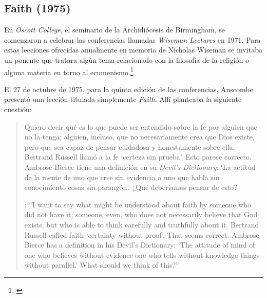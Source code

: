 \subsection{Faith (1975)}

En \emph{Oscott College}, el seminario de la Archidiócesis de Birmingham, se comenzaron a celebrar las conferencias llamadas \emph{Wiseman Lectures} en 1971. Para estas lecciones ofrecidas anualmente en memoria de Nicholas Wiseman se invitaba un ponente que tratara algún tema relacionado con la filosofía de la religión o alguna materia en torno al ecumenismo.\footnote{\cite[Cf.~][7]{wisemanlects}}

El 27 de octubre de 1975, para la quinta edición de las conferencias, Anscombe presentó una lección titulada simplemente \emph{Faith}. Allí planteaba la siguiente cuestión: \blockquote[{\cite[115]{anscombe1981erp:faith}}: \enquote{I want to say what might be understood about faith by someone who did not have it; someone, even, who does not necessarily believe that God exists, but who is able to think carefully and truthfully about it. Bertrand Russell called faith `certainty without proof'. That seems correct. Ambrose Bierce has a definition in his Devil's Dictionary: `The attitude of mind of one who believes without evidence one who tells without knowledge things without parallel.' What should we think of this?}]{Quiero decir qué es lo que puede ser entendido sobre la fe por alguien que no la tenga; alguien, incluso, que no necesariamente crea que Dios existe, pero que sea capaz de pensar cuidadosa y honestamente sobre ella. Bertrand Russell llamó a la fe `certeza sin prueba'. Esto parece correcto. Ambrose Bierce tiene una definición en su \emph{Devil's Dictionary}: `La actitud de la mente de uno que cree sin evidencia a uno que habla sin conocimiento cosas sin parangón'. ¿Qué deberíamos pensar de esto?}

